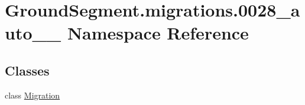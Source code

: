 \hypertarget{namespace_ground_segment_1_1migrations_1_10028__auto__20170115__1524}{}\section{Ground\+Segment.\+migrations.0028\+\_\+auto\+\_\+\_ Namespace Reference}
\label{namespace_ground_segment_1_1migrations_1_10028__auto__20170115__1524}
\subsection*{Classes}
\begin{DoxyCompactItemize}
\item 
class \hyperlink{class_ground_segment_1_1migrations_1_10028__auto__20170115__1524_1_1_migration}{Migration}
\end{DoxyCompactItemize}

